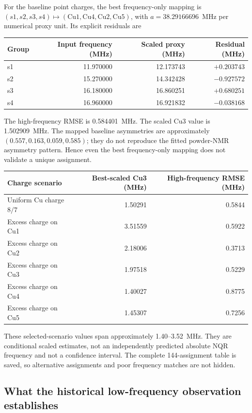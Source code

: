 \documentclass[11pt,a4paper]{article}
\begin{document}
For the baseline point charges, the best frequency-only mapping is
$(s1,s2,s3,s4)\mapsto(\mathrm{Cu1,Cu4,Cu2,Cu5})$, with
$a=38.29166696$~MHz per numerical proxy unit. Its explicit residuals are
\begin{center}
\begin{tabular}{lrrr}
\toprule
Group & Input frequency (MHz) & Scaled proxy (MHz) & Residual (MHz)\\
\midrule
s1 & 11.970000 & 12.173743 & $+0.203743$\\
s2 & 15.270000 & 14.342428 & $-0.927572$\\
s3 & 16.180000 & 16.860251 & $+0.680251$\\
s4 & 16.960000 & 16.921832 & $-0.038168$\\
\bottomrule
\end{tabular}
\end{center}
The high-frequency RMSE is 0.584401~MHz. The scaled Cu3 value is
1.502909~MHz. The mapped baseline asymmetries are approximately
$(0.557,0.163,0.059,0.585)$; they do not reproduce the fitted powder-NMR
asymmetry pattern. Hence even the best frequency-only mapping does not validate
a unique assignment.

\begin{center}
\begin{tabular}{lrr}
\toprule
Charge scenario & Best-scaled Cu3 (MHz) & High-frequency RMSE (MHz)\\
\midrule
Uniform Cu charge $8/7$ & 1.50291 & 0.5844\\
Excess charge on Cu1 & 3.51559 & 0.5922\\
Excess charge on Cu2 & 2.18006 & 0.3713\\
Excess charge on Cu3 & 1.97518 & 0.5229\\
Excess charge on Cu4 & 1.40027 & 0.8775\\
Excess charge on Cu5 & 1.45307 & 0.7256\\
\bottomrule
\end{tabular}
\end{center}

These selected-scenario values span approximately 1.40--3.52~MHz. They are
conditional scaled estimates, not an independently predicted absolute NQR
frequency and not a confidence interval. The complete 144-assignment table is
saved, so alternative assignments and poor frequency matches are not hidden.

\subsection{What the historical low-frequency observation establishes}
\end{document}
